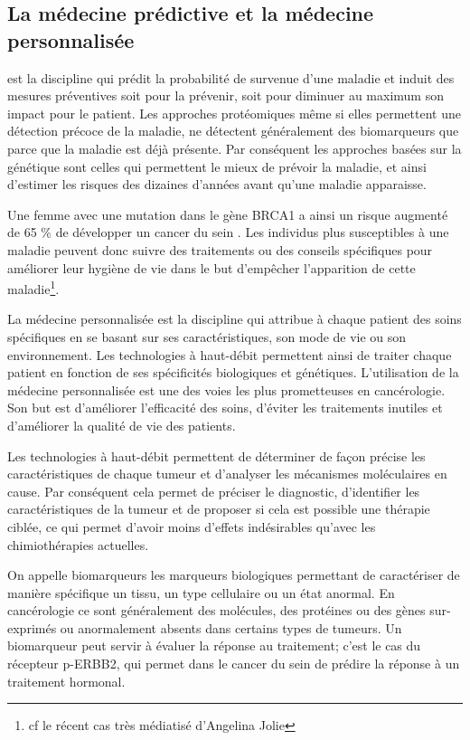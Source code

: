     \subsection{\textcolor{myred}{La médecine prédictive et la médecine personnalisée}}\label{sub:MedPrePer}
       est la discipline qui prédit la probabilité de survenue d'une maladie et induit des mesures préventives soit pour la prévenir, soit pour diminuer au maximum son impact pour le patient.
      Les approches protéomiques même si elles permettent une détection précoce de la maladie, ne détectent généralement des biomarqueurs que parce que la maladie est déjà présente.
      Par conséquent les approches basées sur la génétique sont celles qui permettent le mieux de prévoir la maladie, et ainsi d'estimer les risques des dizaines d'années avant qu'une maladie apparaisse.

      Une femme avec une mutation dans le gène \acs{BRCA1} a ainsi un risque augmenté de 65 \% de développer un cancer du sein \citep{Antoniou2003}.
      Les individus plus susceptibles à une maladie peuvent donc suivre des traitements ou des conseils spécifiques pour améliorer leur hygiène de vie dans le but d'empêcher l'apparition de cette maladie\footnote{cf le récent cas très médiatisé d'Angelina Jolie}.
      \pagebreak

      La médecine personnalisée est la discipline qui attribue à chaque patient des soins spécifiques en se basant sur ses caractéristiques, son mode de vie ou son environnement.
      Les technologies à haut-débit permettent ainsi de traiter chaque patient en fonction de ses spécificités biologiques et génétiques.
      L'utilisation de la médecine personnalisée est une des voies les plus prometteuses en cancérologie.
      Son but est d'améliorer l'efficacité des soins, d'éviter les traitements inutiles et d'améliorer la qualité de vie des patients.

      Les technologies à haut-débit permettent de déterminer de façon précise les caractéristiques de chaque tumeur et d'analyser les mécanismes moléculaires en cause.
      Par conséquent cela permet de préciser le diagnostic, d'identifier les caractéristiques de la tumeur et de proposer si cela est possible une thérapie ciblée, ce qui permet d'avoir moins d'effets indésirables qu'avec les chimiothérapies actuelles.

      On appelle biomarqueurs les marqueurs biologiques permettant de caractériser de manière spécifique un tissu, un type cellulaire ou un état anormal.
      En cancérologie ce sont généralement des molécules, des protéines ou des gènes sur-exprimés ou anormalement absents dans certains types de tumeurs.
      Un biomarqueur peut servir à évaluer la réponse au traitement; c'est le cas du récepteur \acs{p-ERBB2}, qui permet dans le cancer du sein de prédire la réponse à un traitement hormonal.

